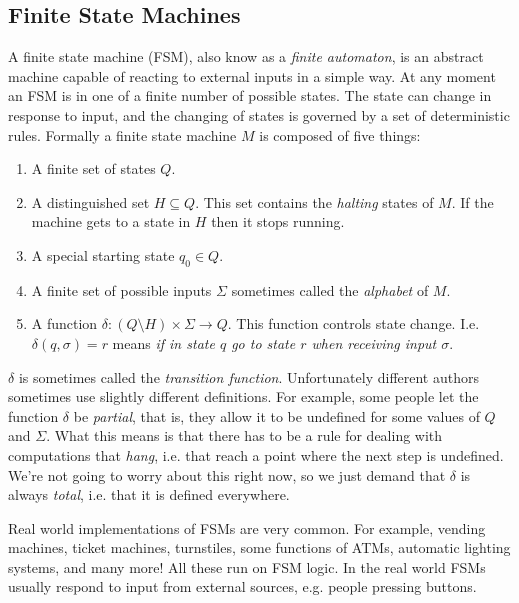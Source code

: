 \documentclass{article}
\theoremstyle{plain}
\begin{document}
\subsection{Finite State Machines}
A finite state machine (FSM), also know as a \emph{finite automaton}, is an abstract machine capable of reacting to external inputs in a simple way. At any moment an FSM is in one of a finite number of possible states. The state can change in response to input, and the changing of states is governed by a set of deterministic rules. Formally a finite state machine $M$ is composed of five things:
\begin{enumerate}
\item A finite set of states $Q$.
\item A distinguished set $H\subseteq Q$. This set contains the \emph{halting} states of $M$. If the machine gets to a state in $H$ then it stops running. 
\item A special starting state $q_0\in Q$.
\item A finite set of possible inputs $\Sigma$ sometimes called the \emph{alphabet} of $M$.
\item A function $\delta:(Q\setminus H)\times \Sigma\to Q$. This function controls state change. I.e. $\delta(q,\sigma)=r$ means \emph{if in state $q$ go to state $r$ when receiving input $\sigma$}.
\end{enumerate} 

$\delta$ is sometimes called the \emph{transition function}. Unfortunately different authors sometimes use slightly different definitions. For example, some people let the function $\delta$ be \emph{partial}, that is, they allow it to be undefined for some values of $Q$ and $\Sigma$. What this means is that there has to be a rule for dealing with computations that \emph{hang}, i.e. that reach a point where the next step is undefined. We're not going to worry about this right now, so we just demand that $\delta$ is always \emph{total}, i.e. that it is defined everywhere.

Real world implementations of FSMs are very common. For example, vending machines, ticket machines, turnstiles, some functions of ATMs, automatic lighting systems, and many more! All these run on FSM logic. In the real world FSMs usually respond to input from external sources, e.g. people pressing buttons. 
\end{document}

